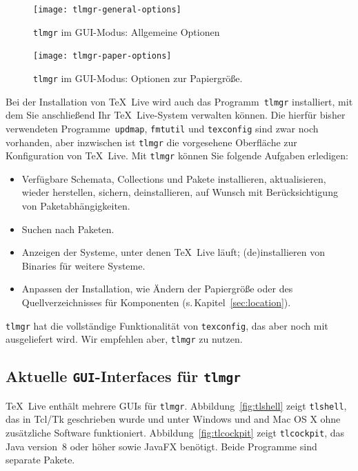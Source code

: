 \documentclass[12pt,ngerman,a4paper,fullparskip]{report}
\newcommand{\TL}{\TeX\ Live\xspace}
\newcommand{\cmdname}[1]{\texttt{#1}}
\newcommand{\prog}[1]{\texttt{#1}}
\begin{document}
\begin{figure}[h]
	\centering
    \texttt{[image: tlmgr-general-options]}
    \caption{\texttt{tlmgr} im GUI-Modus: Allgemeine Optionen}
    \label{fig:tlmgr-general-options}
\end{figure}

\begin{figure}[h]
\centering
\texttt{[image: tlmgr-paper-options]}
    \caption{\texttt{tlmgr} im GUI-Modus: Optionen zur Papiergröße.}
    \label{fig:tlmgr-paper-options}
\end{figure}

Bei der Installation von \TL wird auch das Programm~\prog{tlmgr} installiert, mit dem Sie anschließend Ihr \TL-System verwalten können. Die hierfür bisher verwendeten Programme~\prog{updmap}, \prog{fmtutil} und \prog{texconfig} sind zwar noch vorhanden, aber inzwischen ist \prog{tlmgr} die vorgesehene Oberfläche zur Konfiguration von \TL. Mit \prog{tlmgr} können Sie folgende Aufgaben erledigen:

\begin{itemize} %
\item Verfügbare Schemata, Collections und Pakete installieren, aktualisieren, wieder
     herstellen, sichern, deinstallieren, auf Wunsch mit Berücksichtigung von Paketabhängigkeiten.
\item Suchen nach Paketen.
\item Anzeigen der Systeme, unter denen \TL läuft; (de)installieren von Binaries für weitere Systeme.
\item Anpassen der Installation, wie Ändern der Papiergröße oder des Quellverzeichnisses für Komponenten
 (s.\,Kapitel~\ref{sec:location}).
\end{itemize}

\prog{tlmgr} hat die vollständige Funktionalität von \prog{texconfig}, das aber noch mit ausgeliefert wird. Wir empfehlen aber, \prog{tlmgr} zu nutzen.

\subsection{Aktuelle \texttt{GUI}-Interfaces für \cmdname{tlmgr}}

\TL{} enthält mehrere GUIs für \prog{tlmgr}. Abbildung~\ref{fig:tlshell} zeigt \cmdname{tlshell},
das in Tcl/Tk geschrieben wurde und unter Windows und 
and Mac OS X ohne zusätzliche Software funktioniert. Abbildung~\ref{fig:tlcockpit} zeigt \prog{tlcockpit}, das Java version~8 oder höher sowie JavaFX benötigt. Beide Programme sind separate Pakete.
\end{document}
